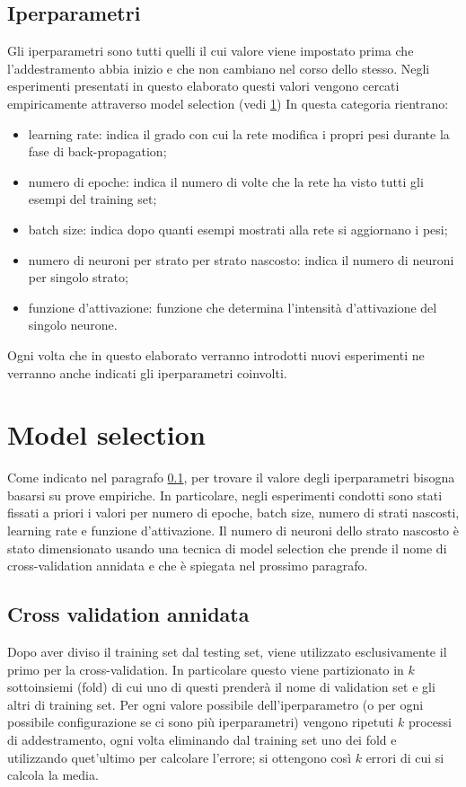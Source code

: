 \documentclass[12pt]{report}
\begin{document}
\subsection{Iperparametri}\label{iperparametri}
Gli iperparametri sono tutti quelli il cui valore viene impostato prima che l'addestramento abbia inizio e che non cambiano nel corso dello stesso. Negli esperimenti presentati in questo elaborato questi valori vengono cercati empiricamente attraverso model selection (vedi \ref{modelselection})
In questa categoria rientrano:
\begin{itemize}
\item{learning rate}: indica il grado con cui la rete modifica i propri pesi durante la fase di back-propagation;
\item{numero di epoche}: indica il numero di volte che la rete ha visto tutti gli esempi del training set;
\item{batch size}: indica dopo quanti esempi mostrati alla rete si aggiornano i pesi;
\item{numero di neuroni per strato per strato nascosto}: indica il numero di neuroni per singolo strato;
\item{funzione d'attivazione}: funzione che determina l'intensità d'attivazione del singolo neurone.
\end{itemize}

Ogni volta che in questo elaborato verranno introdotti nuovi esperimenti ne verranno anche indicati gli iperparametri coinvolti.

\section{Model selection}\label{modelselection}
Come indicato nel paragrafo \ref{iperparametri}, per trovare il valore degli iperparametri bisogna basarsi su prove empiriche. In particolare, negli esperimenti condotti sono stati fissati a priori i valori per numero di epoche, batch size, numero di strati nascosti, learning rate e funzione d'attivazione. Il numero di neuroni dello strato nascosto è stato dimensionato usando una tecnica di model selection che prende il nome di cross-validation annidata e che è spiegata nel prossimo paragrafo.

\subsection{Cross validation annidata}
Dopo aver diviso il training set dal testing set, viene utilizzato esclusivamente  il primo per la cross-validation. In particolare questo viene partizionato in $k$ sottoinsiemi (fold) di cui uno di questi prenderà il nome di validation set e gli altri di training set. Per ogni valore possibile dell'iperparametro (o per ogni possibile configurazione se ci sono più iperparametri) vengono ripetuti $k$ processi di addestramento, ogni volta eliminando dal training set uno dei fold e utilizzando quet'ultimo per calcolare l'errore; si ottengono così $k$ errori di cui si calcola la media.
\end{document}
